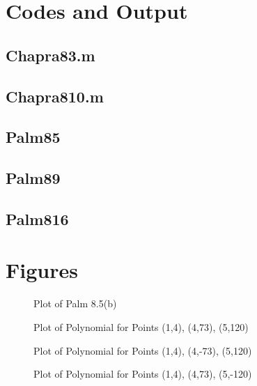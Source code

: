 \documentclass{article}
\begin{document}
\pagebreak
\appendix
\section{Codes and Output}

\subsection{Chapra83.m}

\subsection{Chapra810.m}

\subsection{Palm85}

\subsection{Palm89}

\subsection{Palm816}

\pagebreak
\section{Figures}

\begin{figure}[htb!]
\begin{center}
\caption{Plot of Palm 8.5(b)}
\end{center}
\end{figure}

\begin{figure}[htb!]
\begin{center}
\caption{Plot of Polynomial for Points (1,4), (4,73), (5,120)}
\end{center}
\end{figure}

\begin{figure}[htb!]
\begin{center}
\caption{Plot of Polynomial for Points (1,4), (4,-73), (5,120)}
\end{center}
\end{figure}

\begin{figure}[htb!]
\begin{center}
\caption{Plot of Polynomial for Points (1,4), (4,73), (5,-120)}
\end{center}
\end{figure}
\end{document}
